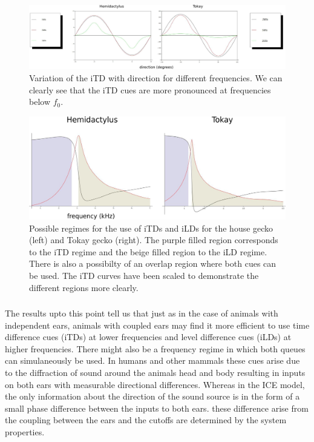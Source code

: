 \begin{figure}[ht!]
\centering
  \includegraphics[width=1.\linewidth]{Diagrams/Plots/iTD/itddirectionboth2.png}
  \caption[Variation of the iTD with direction for different frequencies.]{Variation of the iTD with direction for different frequencies. We can clearly see that the iTD cues are more pronounced
  at frequencies below $f_0$.}
  \label{itddirectionboth}
\end{figure}

\begin{figure}[ht!]
\centering
  \includegraphics[width=.8\linewidth]{Diagrams/Plots/iTD/rangeboth.png}
  \caption[Possible frequency regimes for usage of iTD and iLD cues.]{ Possible regimes for the use of iTDs and iLDs for the house gecko (left) and Tokay gecko (right). The purple filled region corresponds to the iTD regime 
  and the beige filled region to the iLD regime. There is also a possibilty of an overlap region where both cues can be used.  The iTD curves have been scaled to demonstrate the different
  regions more clearly.}
  \label{rangeboth}
\end{figure}

\subsubsection{}
The results upto this point tell us that just as in the case of animals with independent ears, animals
with coupled ears may find it more efficient to use time difference cues (iTDs) at lower frequencies and level difference
cues (iLDs) at higher frequencies. There might also be a frequency regime in which both queues can simulaneously be used. In humans and
other mammals these cues arise due to the diffraction of sound around the animals head and body resulting in inputs on both ears with measurable
directional differences. Whereas in the ICE model, the only information about the direction of the sound source is in the form of a small phase
difference between the inputs to both ears. these difference arise from the coupling between the ears and the cutoffs are determined
by the system properties. 

